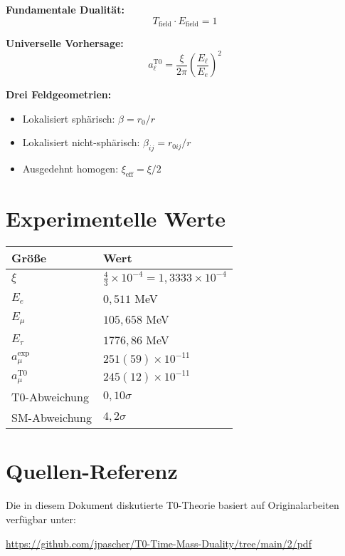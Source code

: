 \documentclass[12pt,a4paper]{report}
\newcommand{\rzero}{r_0}                  %
\begin{document}
	\textbf{Fundamentale Dualität:}
	\begin{equation}
		T_{\text{field}} \cdot E_{\text{field}} = 1
	\end{equation}
	
	\textbf{Universelle Vorhersage:}
	\begin{equation}
		a_\ell^{\text{T0}} = \frac{\xi}{2\pi} \left(\frac{E_\ell}{E_e}\right)^2
	\end{equation}
	
	\textbf{Drei Feldgeometrien:}
	\begin{itemize}
		\item Lokalisiert sphärisch: $\beta = \rzero/r$
		\item Lokalisiert nicht-sphärisch: $\beta_{ij} = r_{0ij}/r$
		\item Ausgedehnt homogen: $\xi_{\text{eff}} = \xi/2$
	\end{itemize}
	
	\section{Experimentelle Werte}
	\label{sec:experimental_values}
	
	\begin{longtable}{|l|l|}
		\hline
		\textbf{Größe} & \textbf{Wert} \\
		\hline
		$\xi$ & $\frac{4}{3} \times 10^{-4} = 1,3333 \times 10^{-4}$ \\
		$E_e$ & $0,511$ MeV \\
		$E_\mu$ & $105,658$ MeV \\
		$E_\tau$ & $1776,86$ MeV \\
		$a_\mu^{\text{exp}}$ & $251(59) \times 10^{-11}$ \\
		$a_\mu^{\text{T0}}$ & $245(12) \times 10^{-11}$ \\
		T0-Abweichung & $0,10\sigma$ \\
		SM-Abweichung & $4,2\sigma$ \\
		\hline
	\end{longtable}
	
	\section{Quellen-Referenz}
	\label{sec:source_reference}
	
	Die in diesem Dokument diskutierte T0-Theorie basiert auf Originalarbeiten verfügbar unter:
	
	\begin{center}
		\url{https://github.com/jpascher/T0-Time-Mass-Duality/tree/main/2/pdf}
	\end{center}
	
	
\end{document}
